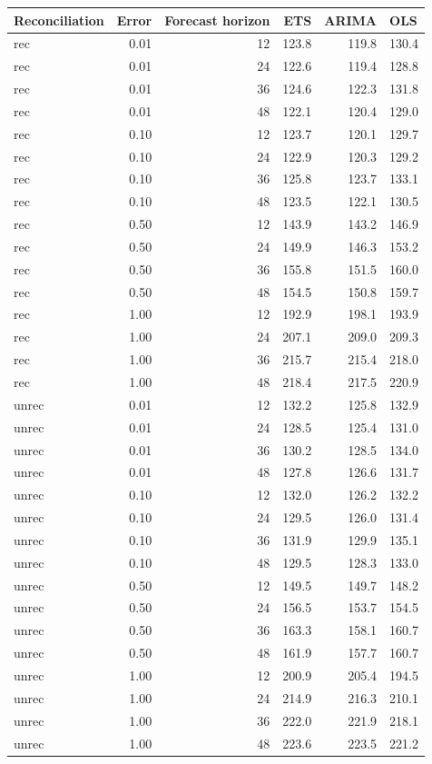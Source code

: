 \documentclass[11pt,a4paper,]{article}
\let\origtable\table
\let\endorigtable\endtable
\renewenvironment{table}[1][2] {
    \expandafter\origtable\expandafter[!htbp]
} {
    \endorigtable
}
\begin{document}
\begin{table}[!h]

\caption{\label{tab:TourismdatasimrollingnoiseFH}Mean RMSE on one to four year test set with different error levels for ETS, ARIMA and OLS with and without reconciliation - Rolling origin - 304 bottom level series and 8 levels of hierarchy - Simulated tourism dataset}
\centering
\begin{tabular}[t]{lrrrrl}
\toprule
Reconciliation & Error & Forecast horizon & ETS & ARIMA & OLS\\
\midrule
rec & 0.01 & 12 & 123.8 & 119.8 & 130.4\\
rec & 0.01 & 24 & 122.6 & 119.4 & 128.8\\
rec & 0.01 & 36 & 124.6 & 122.3 & 131.8\\
rec & 0.01 & 48 & 122.1 & 120.4 & 129.0\\
rec & 0.10 & 12 & 123.7 & 120.1 & 129.7\\
rec & 0.10 & 24 & 122.9 & 120.3 & 129.2\\
rec & 0.10 & 36 & 125.8 & 123.7 & 133.1\\
rec & 0.10 & 48 & 123.5 & 122.1 & 130.5\\
rec & 0.50 & 12 & 143.9 & 143.2 & 146.9\\
rec & 0.50 & 24 & 149.9 & 146.3 & 153.2\\
rec & 0.50 & 36 & 155.8 & 151.5 & 160.0\\
rec & 0.50 & 48 & 154.5 & 150.8 & 159.7\\
rec & 1.00 & 12 & 192.9 & 198.1 & 193.9\\
rec & 1.00 & 24 & 207.1 & 209.0 & 209.3\\
rec & 1.00 & 36 & 215.7 & 215.4 & 218.0\\
rec & 1.00 & 48 & 218.4 & 217.5 & 220.9\\
unrec & 0.01 & 12 & 132.2 & 125.8 & 132.9\\
unrec & 0.01 & 24 & 128.5 & 125.4 & 131.0\\
unrec & 0.01 & 36 & 130.2 & 128.5 & 134.0\\
unrec & 0.01 & 48 & 127.8 & 126.6 & 131.7\\
unrec & 0.10 & 12 & 132.0 & 126.2 & 132.2\\
unrec & 0.10 & 24 & 129.5 & 126.0 & 131.4\\
unrec & 0.10 & 36 & 131.9 & 129.9 & 135.1\\
unrec & 0.10 & 48 & 129.5 & 128.3 & 133.0\\
unrec & 0.50 & 12 & 149.5 & 149.7 & 148.2\\
unrec & 0.50 & 24 & 156.5 & 153.7 & 154.5\\
unrec & 0.50 & 36 & 163.3 & 158.1 & 160.7\\
unrec & 0.50 & 48 & 161.9 & 157.7 & 160.7\\
unrec & 1.00 & 12 & 200.9 & 205.4 & 194.5\\
unrec & 1.00 & 24 & 214.9 & 216.3 & 210.1\\
unrec & 1.00 & 36 & 222.0 & 221.9 & 218.1\\
unrec & 1.00 & 48 & 223.6 & 223.5 & 221.2\\
\bottomrule
\end{tabular}
\end{table}
\end{document}
